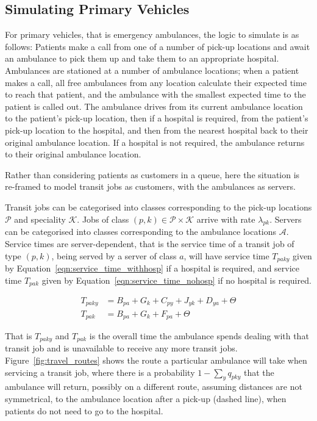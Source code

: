\documentclass[preprint,12pt]{elsarticle}
\begin{document}
\subsection{Simulating Primary Vehicles}\label{sec:simulation_primary}
For primary vehicles, that is emergency ambulances, the logic to simulate is as
follows: Patients make a call from one of a number of pick-up locations and
await an ambulance to pick them up and take them to an appropriate hospital.
Ambulances are stationed at a number of ambulance locations;
when a patient makes a call, all free ambulances from any location calculate
their expected time to reach that patient, and the ambulance with the smallest
expected time to the patient is called out.
The ambulance drives from its current ambulance location to the patient's
pick-up location, then if a hospital is required, from the patient's pick-up location to the hospital, and
then from the nearest hospital back to their original ambulance location.
If a hospital is not required, the ambulance returns to their original ambulance location.

Rather than considering patients as customers in a queue, here the situation is
re-framed to model transit jobs as customers, with the ambulances as servers.

Transit jobs can be categorised into classes corresponding to the pick-up
locations $\mathcal{P}$ and speciality $\mathcal{K}$. Jobs of class $(p, k) \in \mathcal{P} \times \mathcal{K}$ arrive with rate $\lambda_{pk}$. Servers can be categorised into classes corresponding to the ambulance locations $\mathcal{A}$.
Service times are server-dependent, that is the service time of a transit job of
type $(p, k)$, being served by a server of class $a$, will have service time
$T_{paky}$ given by Equation~\ref{eqn:service_time_withhosp} if a hospital is required, and service time $T_{pak}$ given by Equation~\ref{eqn:service_time_nohosp} if no hospital is required.

\begin{align}
T_{paky} &= B_{pa} + G_k + C_{py} + J_{yk} + D_{ya} + \Theta \label{eqn:service_time_withhosp} \\
T_{pak} &= B_{pa} + G_k + F_{pa} + \Theta \label{eqn:service_time_nohosp}
\end{align}

That is $T_{paky}$ and $T_{pak}$ is the overall time the ambulance spends dealing
with that transit job and is unavailable to receive any more transit
jobs. Figure~\ref{fig:travel_routes} shows the route a particular ambulance will
take when servicing a transit job, where there is a probability
$1 - \sum_{y} q_{pky}$ that the ambulance will return, possibly on a different
route, assuming distances are not symmetrical, to the ambulance location after a
pick-up (dashed line), when patients do not need to go to the hospital.
\end{document}
